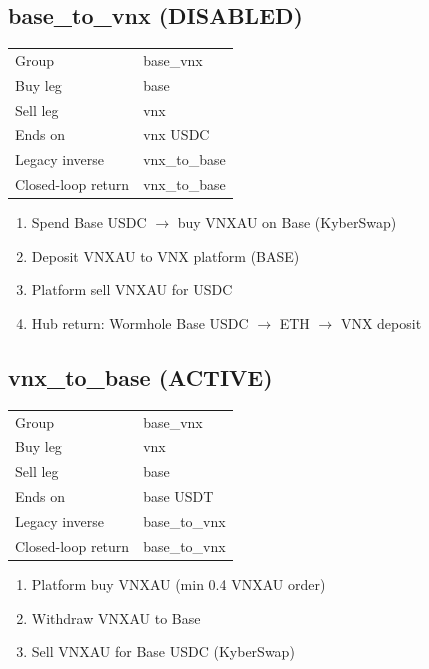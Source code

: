 \documentclass[11pt,a4paper]{article}
\begin{document}
\subsection*{\textcolor{warnred}{base\_to\_vnx} (DISABLED)}
\begin{tabular}{@{}ll@{}}
Group & base\_vnx \\
Buy leg & base \\
Sell leg & vnx \\
Ends on & vnx USDC \\
Legacy inverse & vnx\_to\_base \\
Closed-loop return & vnx\_to\_base \\
\end{tabular}
\begin{enumerate}[nosep,leftmargin=*]
\item Spend Base USDC $\rightarrow$ buy VNXAU on Base (KyberSwap)
\item Deposit VNXAU to VNX platform (BASE)
\item Platform sell VNXAU for USDC
\item Hub return: Wormhole Base USDC $\rightarrow$ ETH $\rightarrow$ VNX deposit
\end{enumerate}
\subsection*{\textcolor{okgreen}{vnx\_to\_base} (ACTIVE)}
\begin{tabular}{@{}ll@{}}
Group & base\_vnx \\
Buy leg & vnx \\
Sell leg & base \\
Ends on & base USDT \\
Legacy inverse & base\_to\_vnx \\
Closed-loop return & base\_to\_vnx \\
\end{tabular}
\begin{enumerate}[nosep,leftmargin=*]
\item Platform buy VNXAU (min 0.4 VNXAU order)
\item Withdraw VNXAU to Base
\item Sell VNXAU for Base USDC (KyberSwap)
\end{enumerate}
\end{document}
